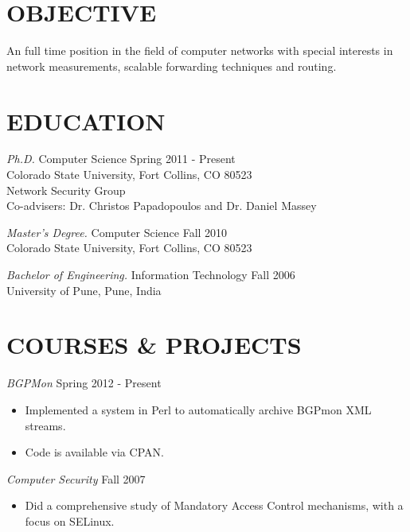 \documentclass[line,margin]{res}
\begin{document}
\address{1775 Milmont Dr. Apt. N205 Milpitas CA 95035}
\address{Email: kaustubh.gadkari@gmail.com \\
Phone: +1-970-261-1699}


\begin{resume}

\section{OBJECTIVE}
 An full time position in the field of computer networks with special
               interests in network measurements, scalable forwarding
               techniques and routing.


\section{EDUCATION}
                {\sl Ph.D.} Computer Science \hfill Spring 2011 - Present\\
                    Colorado State University, Fort Collins, CO 80523\\
                    Network Security Group\\
                    Co-advisers: Dr. Christos Papadopoulos and Dr. Daniel Massey

                {\sl Master's Degree.} Computer Science \hfill Fall 2010\\
                    Colorado State University, Fort Collins, CO 80523

                {\sl Bachelor of Engineering.} Information Technology \hfill Fall 2006\\
                	  University of Pune, Pune, India

\section{COURSES \& PROJECTS}
					{\sl BGPMon} \hfill Spring 2012 - Present
				\begin{itemize} \itemsep -2pt
							\item Implemented a system in Perl to automatically archive BGPmon XML streams.
							\item Code is available via CPAN.
						\end{itemize}

					{\sl Computer Security} \hfill Fall 2007
						\begin{itemize} \itemsep -2pt
						\item Did a comprehensive study of Mandatory Access Control mechanisms, with a focus on SELinux.
						\end{itemize}


\end{resume}
\end{document}
